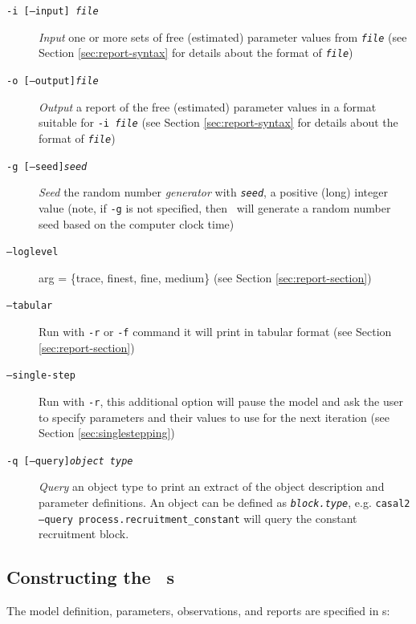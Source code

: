 \begin{description}
\item [\texttt{-i [--input] \emph{file}}] \emph{Input} one or more sets of free (estimated) parameter values from \texttt{\emph{file}} (see Section \ref{sec:report-syntax} for details about the format of \texttt{\emph{file}})

\item [\texttt{-o [--output]\emph{file}}] \emph{Output} a report of the free (estimated) parameter values in a format suitable for \texttt{-i \emph{file}} (see Section \ref{sec:report-syntax} for details about the format of \texttt{\emph{file}})

\item [\texttt{-g [--seed]\emph{seed}}]  \emph{Seed} the random number \emph{generator} with \texttt{\emph{seed}}, a positive (long) integer value (note, if \texttt{-g} is not specified, then \CNAME\ will  generate a random number seed based on the computer clock time)

\item [\texttt{--loglevel}] arg = \{trace, finest, fine, medium\} (see Section \ref{sec:report-section})

\item [\texttt{--tabular}] Run with \texttt{-r} or \texttt{-f}  command it will print  in tabular format (see Section \ref{sec:report-section})

\item [\texttt{--single-step}] Run with \texttt{-r}, this additional option will pause the model and ask the user to specify parameters and their values to use for the next iteration (see Section \ref{sec:singlestepping})

\item [\texttt{-q [--query]\emph{object type}}] \emph{Query} an object type to print an extract of the object description and parameter definitions.  An object can be defined as \texttt{\emph{block.type}}, e.g. \texttt{casal2 --query process.recruitment\_constant} will query the constant recruitment block.

\end{description}

\subsection{Constructing the \CNAME\ \config s \label{constructing-config}}

The model definition, parameters, observations, and reports are specified in \config s:

